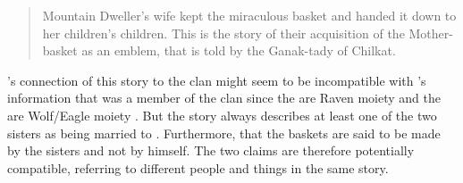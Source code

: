 \begin{quote}\small
Mountain Dweller’s wife kept the miraculous basket and handed it down to her children’s children.
This is the story of their acquisition of the Mother-basket as an emblem, that is told by the Ganak-tady of Chilkat.
\end{quote}

\citeauthor{paul:1944}’s connection of this story to the  clan might seem to be incompatible with \citeauthor{swanton:1909}’s information that  was a member of the  clan since the  are Raven moiety and the  are Wolf/Eagle moiety \parencites[399–400]{swanton:1908}[436]{emmons:1991}.
But the story always describes at least one of the two sisters as being married to .
Furthermore, that the baskets are said to be made by the sisters and not by  himself.
The two claims are therefore potentially compatible, referring to different people and things in the same story.


